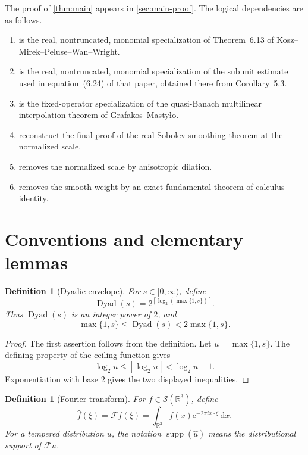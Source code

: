 \documentclass[11pt]{article}
\newtheorem{definition}[theorem]{Definition}
\newcommand{\R}{\mathbb{R}}
\newcommand{\Sch}{\mathcal{S}}
\newcommand{\supp}{\operatorname{supp}}
\newcommand{\Dyad}{\operatorname{Dyad}}
\newcommand{\F}{\mathcal{F}}
\newcommand{\e}{\mathrm{e}}
\newcommand{\dd}{\,\mathrm{d}}
\begin{document}
	The proof of \cref{thm:main} appears in \cref{sec:main-proof}.  The logical dependencies are as follows.
	
	\begin{enumerate}
		\item {} is the real, nontruncated, monomial specialization of Theorem~6.13 of Kosz--Mirek--Peluse--Wan--Wright.
		\item {} is the real, nontruncated, monomial specialization of the subunit estimate used in equation~(6.24) of that paper, obtained there from Corollary~5.3.
		\item {} is the fixed-operator specialization of the quasi-Banach multilinear interpolation theorem of Grafakos--Masty\l o.
		\item {} reconstruct the final proof of the real Sobolev smoothing theorem at the normalized scale.
		\item {} removes the normalized scale by anisotropic dilation.
		\item {} removes the smooth weight by an exact fundamental-theorem-of-calculus identity.
	\end{enumerate}
	
	\section{Conventions and elementary lemmas}
	
	\begin{definition}[Dyadic envelope]\label{def:dyadic-envelope}
		For \(s\in[0,\infty)\), define
		\[
		\Dyad(s)=2^{\left\lceil\log_2(\max\{1,s\})\right\rceil}.
		\]
		Thus \(\Dyad(s)\) is an integer power of \(2\), and
		\[
		\max\{1,s\}\leq\Dyad(s)<2\max\{1,s\}.
		\]
	\end{definition}
	
	\begin{proof}
		The first assertion follows from the definition.  Let \(u=\max\{1,s\}\).  The defining property of the ceiling function gives
		\[
		\log_2 u\leq\left\lceil\log_2 u\right\rceil<\log_2 u+1.
		\]
		Exponentiation with base \(2\) gives the two displayed inequalities.
	\end{proof}
	
	\begin{definition}[Fourier transform]\label{def:fourier}
		For \(f\in\Sch(\R^3)\), define
		\[
		\widehat f(\xi)=\F f(\xi)=\int_{\R^3}f(x)\e^{-2\pi i x\cdot\xi}\dd x.
		\]
		For a tempered distribution \(u\), the notation \(\supp(\widehat u)\) means the distributional support of \(\F u\).
	\end{definition}
	
\end{document}
